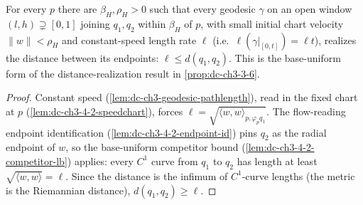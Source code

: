 \begin{lemma}
  \label{lem:dc-ch3-4-2-lowerbound}
  \leanok
  For every $p$ there are $\beta_H,\rho_H>0$ such that every geodesic $\gamma$ on an open window
  $(l,h)\supsetneq[0,1]$ joining $q_1,q_2$ within $\beta_H$ of $p$, with small initial chart velocity
  $\|w\|<\rho_H$ and constant-speed length rate $\ell$ (i.e.\ $\ell(\gamma|_{[0,t]})=\ell t$), realizes
  the distance between its endpoints: $\ell\le d(q_1,q_2)$. This is the
  base-uniform form of the distance-realization result in
  \cref{prop:dc-ch3-3-6}.
\end{lemma}
\begin{proof}
  \sketch
  \leanok
  Constant speed (\cref{lem:dc-ch3-geodesic-pathlength}), read in the fixed chart at $p$
  (\cref{lem:dc-ch3-4-2-speedchart}), forces $\ell=\sqrt{\langle w,w\rangle_{p,\varphi_p q_1}}$. The
  flow-reading endpoint identification (\cref{lem:dc-ch3-4-2-endpoint-id}) pins $q_2$ as the radial
  endpoint of $w$, so the base-uniform competitor bound (\cref{lem:dc-ch3-4-2-competitor-lb}) applies:
  every $C^1$ curve from $q_1$ to $q_2$ has length at least $\sqrt{\langle w,w\rangle}=\ell$. Since the
  distance is the infimum of $C^1$-curve lengths (the metric is the Riemannian distance),
  $d(q_1,q_2)\ge\ell$.
\end{proof}

